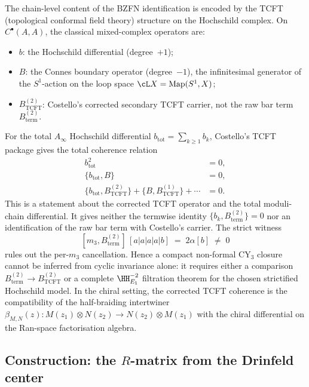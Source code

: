 \begin{remark}
\label{rem:tcft-argument}
The chain-level content of the BZFN identification is encoded by the
TCFT (topological conformal field theory) structure on the Hochschild
complex. On $C^\bullet(A,A)$, the classical mixed-complex operators are:
\begin{itemize}
 \item $b$: the Hochschild differential (degree~$+1$);
 \item $B$: the Connes boundary operator (degree~$-1$), the
 infinitesimal generator of the $S^1$-action on the loop space
 $\cL X = \mathrm{Map}(S^1, X)$;
 \item $B_{\mathrm{TCFT}}^{(2)}$: Costello's corrected secondary
 TCFT carrier, not the raw bar term $B_{\mathrm{term}}^{(2)}$.
\end{itemize}
For the total $A_\infty$ Hochschild differential
$b_{\mathrm{tot}}=\sum_{k\geq 1} b_k$, Costello's TCFT package gives
the total coherence relation
\begin{align*}
 b_{\mathrm{tot}}^2 &= 0, \\
 \{b_{\mathrm{tot}},B\} &= 0, \\
 \{b_{\mathrm{tot}},B_{\mathrm{TCFT}}^{(2)}\}
  + \{B,B_{\mathrm{TCFT}}^{(1)}\} + \cdots &= 0.
\end{align*}
This is a statement about the corrected TCFT operator and the total
moduli-chain differential. It gives neither the termwise identity
$\{b_k,B_{\mathrm{term}}^{(2)}\}=0$ nor an identification of the raw
bar term with Costello's carrier. The strict witness
\[
 [m_3,B_{\mathrm{term}}^{(2)}]\,[a|a|a|a|b]
 \;=\; 2\alpha[b]\;\neq\;0
\]
rules out the per-$m_3$ cancellation. Hence a compact non-formal
CY$_3$ closure cannot be inferred from cyclic invariance alone: it
requires either a comparison
$B_{\mathrm{term}}^{(2)}\to B_{\mathrm{TCFT}}^{(2)}$ or a complete
$\HH^{-2}_{E_1}$ filtration theorem for the chosen strictified
Hochschild model. In the chiral setting, the corrected TCFT coherence
is the compatibility of the half-braiding intertwiner
$\beta_{M,N}(z) \colon M(z_1) \otimes N(z_2) \to N(z_2) \otimes M(z_1)$
with the chiral differential on the Ran-space factorisation algebra.
\end{remark}

\subsection{Construction: the \texorpdfstring{$R$}{R}-matrix from the Drinfeld center}
\label{subsec:rmatrix-from-center}

